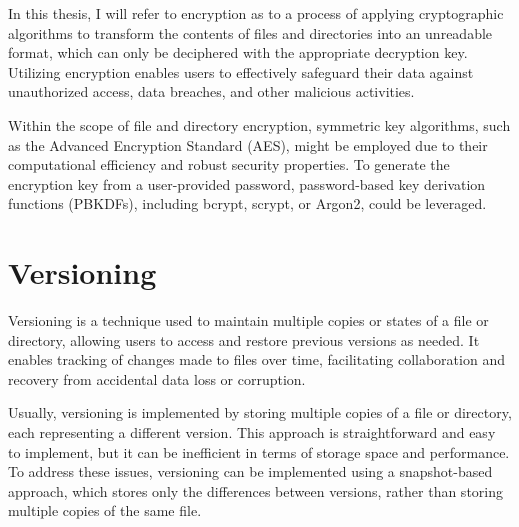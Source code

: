 In this thesis, I will refer to encryption as to a process of applying cryptographic algorithms to transform the contents of files and directories into an unreadable format, which can only be deciphered with the appropriate decryption key.
Utilizing encryption enables users to effectively safeguard their data against unauthorized access, data breaches, and other malicious activities.

Within the scope of file and directory encryption, symmetric key algorithms, such as the Advanced Encryption Standard (AES), might be employed due to their computational efficiency and robust security properties.
To generate the encryption key from a user-provided password, password-based key derivation functions (PBKDFs), including bcrypt, scrypt, or Argon2, could be leveraged.

\section{Versioning}\label{sec:versioning}

Versioning is a technique used to maintain multiple copies or states of a file or directory, allowing users to access and restore previous versions as needed.
It enables tracking of changes made to files over time, facilitating collaboration and recovery from accidental data loss or corruption.

Usually, versioning is implemented by storing multiple copies of a file or directory, each representing a different version.
This approach is straightforward and easy to implement, but it can be inefficient in terms of storage space and performance.
To address these issues, versioning can be implemented using a snapshot-based approach, which stores only the differences between versions, rather than storing multiple copies of the same file.